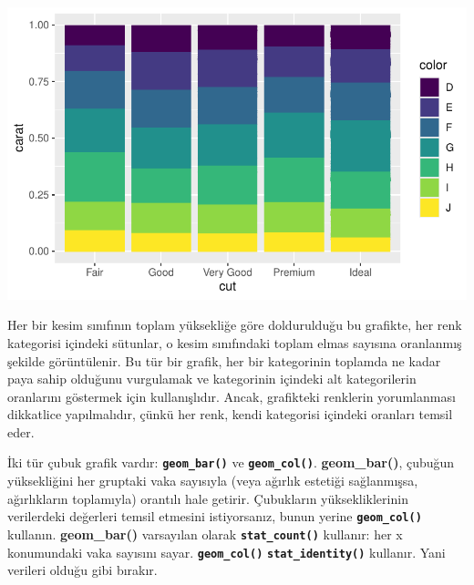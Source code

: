 \documentclass[
  letterpaper,
  DIV=11,
  numbers=noendperiod]{scrreprt}
\begin{document}
\includegraphics{ggplot2_files/figure-pdf/unnamed-chunk-18-1.pdf}

Her bir kesim sınıfının toplam yüksekliğe göre doldurulduğu bu grafikte,
her renk kategorisi içindeki sütunlar, o kesim sınıfındaki toplam elmas
sayısına oranlanmış şekilde görüntülenir. Bu tür bir grafik, her bir
kategorinin toplamda ne kadar paya sahip olduğunu vurgulamak ve
kategorinin içindeki alt kategorilerin oranlarını göstermek için
kullanışlıdır. Ancak, grafikteki renklerin yorumlanması dikkatlice
yapılmalıdır, çünkü her renk, kendi kategorisi içindeki oranları temsil
eder.

\begin{tcolorbox}[enhanced jigsaw, colback=white, coltitle=black, colbacktitle=quarto-callout-warning-color!10!white, opacitybacktitle=0.6, opacityback=0, toprule=.15mm, bottomrule=.15mm, bottomtitle=1mm, rightrule=.15mm, breakable, arc=.35mm, colframe=quarto-callout-warning-color-frame, titlerule=0mm, left=2mm, leftrule=.75mm, toptitle=1mm, title=\textcolor{quarto-callout-warning-color}{\faExclamationTriangle}\hspace{0.5em}{Dikkat}]

İki tür çubuk grafik vardır: \textbf{\texttt{geom\_bar()}} ve
\textbf{\texttt{geom\_col()}}. \textbf{geom\_bar()}, çubuğun
yüksekliğini her gruptaki vaka sayısıyla (veya ağırlık estetiği
sağlanmışsa, ağırlıkların toplamıyla) orantılı hale getirir. Çubukların
yüksekliklerinin verilerdeki değerleri temsil etmesini istiyorsanız,
bunun yerine \textbf{\texttt{geom\_col()}} kullanın.
\textbf{geom\_bar()} varsayılan olarak \textbf{\texttt{stat\_count()}}
kullanır: her x konumundaki vaka sayısını sayar.
\textbf{\texttt{geom\_col()}} \textbf{\texttt{stat\_identity()}}
kullanır. Yani verileri olduğu gibi bırakır.

\end{tcolorbox}
\end{document}
